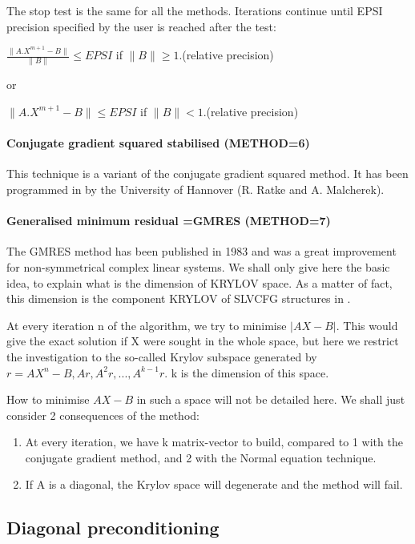 The stop test is the same for all the methods. Iterations continue until EPSI
precision specified by the user is reached after the test:

$\frac{\lVert{A.X^{m+1}-B}\rVert}{\lVert{B}\rVert} \leq EPSI$
if $\lVert{B}\rVert \ge 1.$(relative precision)

or

$\lVert{A.X^{m+1}-B}\rVert \leq EPSI$ if $\lVert{B}\rVert < 1.$(relative precision)

\paragraph{Conjugate gradient squared stabilised (METHOD=6)}

This technique is a variant of the conjugate gradient squared
method. It has been programmed in \bief by the University of Hannover (R. Ratke
and A. Malcherek).

\paragraph{Generalised minimum residual =GMRES (METHOD=7)}

The GMRES method has been published in 1983 and was a great improvement for
non-symmetrical complex linear systems. We shall only give here the basic idea,
to explain what is the dimension of KRYLOV space. As a matter of fact, this
dimension is the component KRYLOV of SLVCFG structures in \bief.

At every iteration n of the algorithm, we try to minimise $\left|AX-B\right|$.
This would give the exact solution if X were sought in the whole space, but
here we restrict the investigation to the so-called Krylov subspace generated
by $r = AX^{n} - B, Ar, A^{2}r, ..., A^{k-1}r$. k is the dimension of this space.

How to minimise $AX-B$ in such a space will not be detailed here. We shall just
consider 2 consequences of the method:

\begin{enumerate}
  \item At every iteration, we have k matrix-vector to build, compared to 1
    with the conjugate gradient method, and 2 with the Normal
    equation technique.
  \item If A is a diagonal, the Krylov space will degenerate and the method
    will fail.
\end{enumerate}

\subsection{Diagonal preconditioning}

